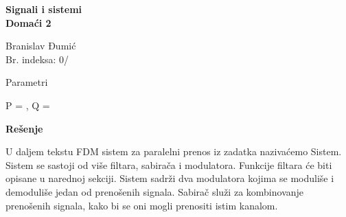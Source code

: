 \documentclass[titlepage,a4paper,12pt]{article}
\begin{document}
	
	
	\begin{titlepage}
		\begin{center}
			\vspace*{1cm}
			
			\Huge
			\textbf{Signali i sistemi}\\
			\LARGE
			\textbf{Domaći 2}
			
			\vspace{1cm}
			\Large
			
			Branislav Đumić\\
			Br. indeksa: 0\indeks/\godina
			\vfill
			
			\vfill
			Parametri
			
			\vspace{0.25cm}
			\large
			P = \Pval, Q = \Qval
			
		\end{center}
	\end{titlepage}
	\normalfont
	\tableofcontents
	\clearpage
	
	\clearpage
	\begin{center}
		\LARGE\textbf{Rešenje}
	\end{center}

	\indent U daljem tekstu FDM sistem za paralelni prenos iz zadatka nazivaćemo Sistem. Sistem se sastoji od više filtara, sabirača i modulatora. Funkcije filtara će biti opisane u narednoj sekciji. Sistem sadrži dva modulatora kojima se moduliše i demoduliše jedan od prenošenih signala. Sabirač služi za kombinovanje prenošenih signala, kako bi se oni mogli prenositi istim kanalom.
\end{document}

